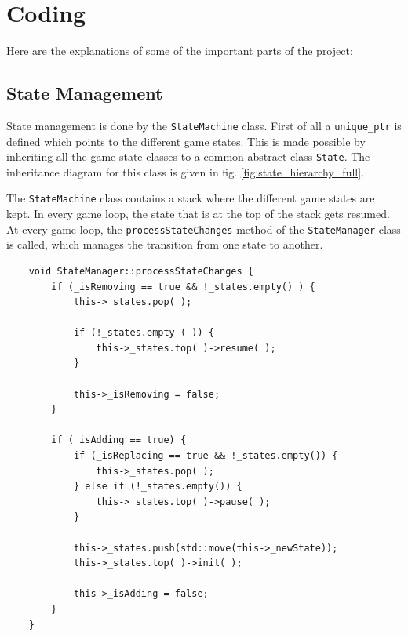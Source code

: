 \documentclass[main]{subfiles}
\begin{document}
\section{Coding} 



Here are the explanations of some of the important parts of the project:

\subsection{State Management}
State management is done by the \texttt{StateMachine} class. First of all a \texttt{unique\_ptr} is defined which points to the different game states. This is made possible by inheriting all the game state classes to a common abstract class \texttt{State}. 
The inheritance diagram for this class is given in fig. \ref{fig:state_hierarchy_full}. 

The \texttt{StateMachine} class contains a stack where the different game states are kept. In every game loop, the state that is at the top of the stack gets resumed. At every game loop, the \texttt{processStateChanges} method of the \texttt{StateManager} class is called, which manages the transition from one state to another.

\begin{verbatim}
    void StateManager::processStateChanges {
        if (_isRemoving == true && !_states.empty() ) {
            this->_states.pop( );

            if (!_states.empty ( )) {
                this->_states.top( )->resume( );
            }

            this->_isRemoving = false;
        }

        if (_isAdding == true) {
            if (_isReplacing == true && !_states.empty()) {
                this->_states.pop( );
            } else if (!_states.empty()) {
                this->_states.top( )->pause( );
            }

            this->_states.push(std::move(this->_newState));
            this->_states.top( )->init( );

            this->_isAdding = false;
        }
    }
\end{verbatim}
\end{document}
